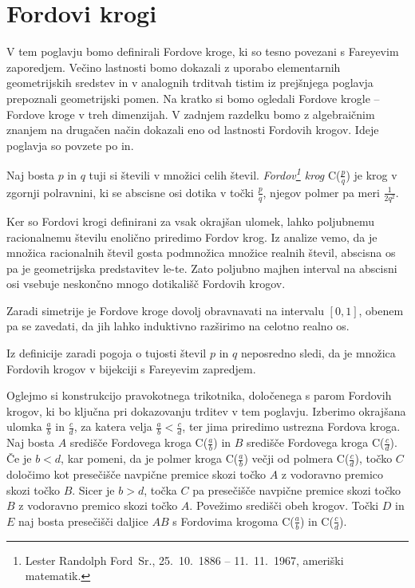 \documentclass[mat1]{fmfdelo}
\begin{document}
\section{Fordovi krogi}

V tem poglavju bomo definirali Fordove kroge, ki so tesno povezani s Fareyevim zaporedjem. Večino lastnosti bomo dokazali z uporabo elementarnih geometrijskih sredstev in v analognih trditvah tistim iz prejšnjega poglavja prepoznali geometrijski pomen. Na kratko si bomo ogledali Fordove krogle -- Fordove kroge v treh dimenzijah. V zadnjem razdelku bomo z algebraičnim znanjem na drugačen način dokazali eno od lastnosti Fordovih krogov.
Ideje poglavja so povzete po \cite[poglavje 4]{fareyproject} in\cite{ford}.

\begin{definicija}
Naj bosta $p$ in $q$ tuji si števili v množici celih števil.
\emph{Fordov\footnote{Lester Randolph Ford~Sr., 25.\ 10.\ 1886 -- 11.\ 11.\ 1967, ameriški matematik.} krog} C($\frac{p}{q}$) je krog v zgornji polravnini, ki se abscisne osi dotika v točki $\frac{p}{q}$, njegov polmer pa meri $\frac{1}{2q^2}$. 
\end{definicija}


Ker so Fordovi krogi definirani za vsak okrajšan ulomek, lahko poljubnemu racionalnemu številu enolično priredimo Fordov krog. Iz analize vemo, da je množica racionalnih števil gosta podmnožica množice realnih števil, abscisna os pa je geometrijska predstavitev le-te. Zato poljubno majhen interval na abscisni osi vsebuje neskončno mnogo dotikališč Fordovih krogov.

Zaradi simetrije je Fordove kroge dovolj obravnavati na intervalu $[0,1]$, obenem pa se zavedati, da jih lahko induktivno razširimo na celotno realno os.

\begin{opomba}
Iz definicije zaradi pogoja o tujosti števil $p$ in $q$ neposredno sledi, da je množica Fordovih krogov v bijekciji s Fareyevim zapredjem.
\end{opomba}

Oglejmo si konstrukcijo pravokotnega trikotnika, določenega s parom Fordovih krogov, ki bo ključna pri dokazovanju trditev v tem poglavju. Izberimo okrajšana ulomka $\frac{a}{b}$ in $\frac{c}{d}$, za katera velja $\frac{a}{b} < \frac{c}{d}$, ter jima priredimo ustrezna Fordova kroga. Naj bosta $A$ središče Fordovega kroga C($\frac{a}{b}$) in $B$ središče Fordovega kroga C($\frac{c}{d}$). Če je $b<d$, kar pomeni, da je polmer kroga C($\frac{a}{b}$) večji od polmera C($\frac{c}{d}$), točko $C$ določimo kot presečišče navpične premice skozi točko $A$ z vodoravno premico skozi točko $B$. Sicer je $b>d$, točka $C$ pa presečišče navpične premice skozi točko $B$ z vodoravno premico skozi točko $A$. Povežimo središči obeh krogov. Točki $D$ in $E$ naj bosta presečišči daljice $AB$ s Fordovima krogoma C($\frac{a}{b}$) in C($\frac{c}{d}$).
\end{document}
